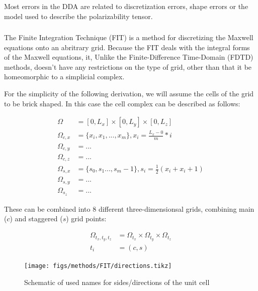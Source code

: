             Most errors in the DDA are related to discretization errors, shape errors or the model used to describe the polarizability tensor.

        \subsubsection{}
        \label{subsec:FIT}
                The Finite Integration Technique (FIT) is a method for discretizing the Maxwell equations onto an abritrary
            grid\cite{weiland2001discrete}.  Because the FIT deals with the integral forms of the Maxwell equations, it,
            Unlike the Finite-Difference Time-Domain (FDTD) methods, doesn't have any restrictions on the type of grid,
            other than that it be homeomorphic to a simplicial complex.

            For the simplicity of the following derivation\cite{rahimi2011finite}, we will assume the cells of the grid to be brick shaped. In this
            case the cell complex can be described as follows:

            \begin{align}
                \Omega &= [0, L_x]\times[0, L_y]\times[0, L_z] \\
                \Omega_{c,x} &= \{x_i, x_1, ..., x_m\}, x_i = \frac{L_x - 0}{m}*i \\
                \Omega_{c,y} &= ... \\
                \Omega_{c,z} &= ... \\
                \Omega_{s,x} &= \{s_0, s_1 ..., s_m-1\}, s_i = \frac{1}{2}(x_i + x_i+1) \\
                \Omega_{s,y} &= ... \\
                \Omega_{s_z} &= ...
            \end{align}

            These can be combined into 8 different three-dimensionsal grids, combining main ($c$) and staggered ($s$) grid points:

            \begin{align}
                \Omega_{t_x, t_y, t_z} &= \Omega_{t_x}\times\Omega_{t_y}\times\Omega_{t_z}\\
                t_i &= (c, s)
            \end{align}


            \begin{figure}
                \centering
                \texttt{[image: figs/methods/FIT/directions.tikz]}
                \caption{Schematic of used names for sides/directions of the unit cell}
                \label{fig:Dir_Int}
            \end{figure}


